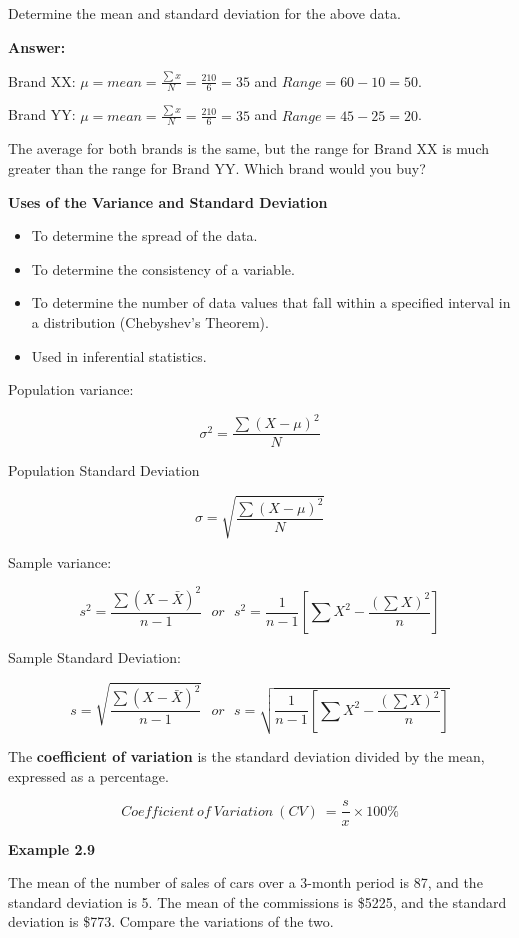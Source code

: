 \documentclass[
  a4paper,
  DIV=11,
  numbers=noendperiod,
  oneside]{scrreprt}
\providecommand{\tightlist}{%
  \setlength{\itemsep}{0pt}\setlength{\parskip}{0pt}}\usepackage{longtable,booktabs,array}
\begin{document}
Determine the mean and standard deviation for the above data.

{\textbf{Answer:}}

{ Brand XX: \(\mu = mean = \frac{\sum{x}}{N} = \frac{210}{6} = 35\) and
\(Range = 60 - 10 = 50\). }

Brand YY: \(\mu = mean = \frac{\sum{x}}{N} = \frac{210}{6} = 35\) and
\(Range = 45 -25 = 20\).

The average for both brands is the same, but the range for Brand XX is
much greater than the range for Brand YY. Which brand would you buy?

\textbf{Uses of the Variance and Standard Deviation}

\begin{itemize}
\tightlist
\item
  To determine the spread of the data.
\item
  To determine the consistency of a variable.
\item
  To determine the number of data values that fall within a specified
  interval in a distribution (Chebyshev's Theorem).
\item
  Used in inferential statistics.
\end{itemize}

Population variance:

\[
\sigma^2 = \frac{\sum{(X - \mu)^2}}{N}
\]

Population Standard Deviation

\[
\sigma = \sqrt{ \frac{\sum{(X - \mu)^2}}{N}}
\]

Sample variance:

\[
s^2 = \frac{\sum{(X - \bar{X})^2}}{n-1}\ \ \ or\ \ \ s^2 = \frac{1}{n-1}\left[\sum{X^2} - \frac{(\sum{X})^2}{n}\right]
\]

Sample Standard Deviation:

\[
s = \sqrt{\frac{\sum{(X - \bar{X})^2}}{n-1}}\ \ \ or\ \ \ s = \sqrt{\frac{1}{n-1}\left[\sum{X^2} - \frac{(\sum{X})^2}{n}\right]}
\]

The \textbf{coefficient of variation} is the standard deviation divided
by the mean, expressed as a percentage.

\[
Coefficient\ of\ Variation\ (CV)\ = \frac{s}{x} \times 100\%
\]

{\textbf{Example 2.9}}

The mean of the number of sales of cars over a 3-month period is 87, and
the standard deviation is 5. The mean of the commissions is \$5225, and
the standard deviation is \$773. Compare the variations of the two.
\end{document}
